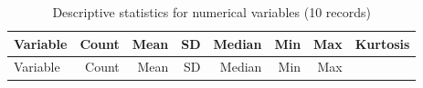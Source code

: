 \documentclass[
]{article}
\begin{document}
\begin{longtable}[]{@{}lrrrrrrr@{}}
\caption{Descriptive statistics for numerical variables (10
records)}\tabularnewline
\toprule
\begin{minipage}[b]{0.16\columnwidth}\raggedright
Variable\strut
\end{minipage} & \begin{minipage}[b]{0.08\columnwidth}\raggedleft
Count\strut
\end{minipage} & \begin{minipage}[b]{0.08\columnwidth}\raggedleft
Mean\strut
\end{minipage} & \begin{minipage}[b]{0.08\columnwidth}\raggedleft
SD\strut
\end{minipage} & \begin{minipage}[b]{0.09\columnwidth}\raggedleft
Median\strut
\end{minipage} & \begin{minipage}[b]{0.07\columnwidth}\raggedleft
Min\strut
\end{minipage} & \begin{minipage}[b]{0.09\columnwidth}\raggedleft
Max\strut
\end{minipage} & \begin{minipage}[b]{0.11\columnwidth}\raggedleft
Kurtosis\strut
\end{minipage}\tabularnewline
\midrule
\endfirsthead
\toprule
\begin{minipage}[b]{0.16\columnwidth}\raggedright
Variable\strut
\end{minipage} & \begin{minipage}[b]{0.08\columnwidth}\raggedleft
Count\strut
\end{minipage} & \begin{minipage}[b]{0.08\columnwidth}\raggedleft
Mean\strut
\end{minipage} & \begin{minipage}[b]{0.08\columnwidth}\raggedleft
SD\strut
\end{minipage} & \begin{minipage}[b]{0.09\columnwidth}\raggedleft
Median\strut
\end{minipage} & \begin{minipage}[b]{0.07\columnwidth}\raggedleft
Min\strut
\end{minipage} & \begin{minipage}[b]{0.09\columnwidth}\raggedleft
Max\strut
\end{minipage} & \begin{minipage}[b]{0.11\columnwidth}\raggedleft

\end{minipage}
\end{longtable}
\end{document}

